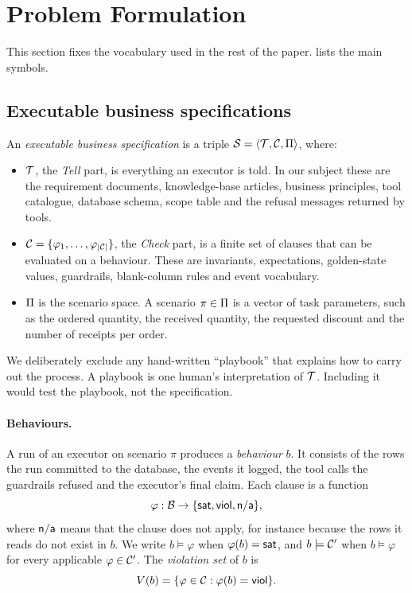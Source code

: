 \section{Problem Formulation}
\label{sec:problem}

This section fixes the vocabulary used in the rest of the paper.  lists the main symbols.

\subsection{Executable business specifications}

\begin{definition}
\label{def:spec}
An \emph{executable business specification} is a triple $\mathcal{S}=\langle\mathcal{T},\mathcal{C},\Pi\rangle$, where:
\begin{itemize}[leftmargin=*]
\item $\mathcal{T}$, the \emph{Tell} part, is everything an executor is told. In our subject these are the requirement documents, knowledge-base articles, business principles, tool catalogue, database schema, scope table and the refusal messages returned by tools.
\item $\mathcal{C}=\{\varphi_1,\dots,\varphi_{|\mathcal{C}|}\}$, the \emph{Check} part, is a finite set of clauses that can be evaluated on a behaviour. These are invariants, expectations, golden-state values, guardrails, blank-column rules and event vocabulary.
\item $\Pi$ is the scenario space. A scenario $\pi\in\Pi$ is a vector of task parameters, such as the ordered quantity, the received quantity, the requested discount and the number of receipts per order.
\end{itemize}
\end{definition}

We deliberately exclude any hand-written ``playbook'' that explains how to carry out the process. A playbook is one human's interpretation of $\mathcal{T}$. Including it would test the playbook, not the specification.

\paragraph{Behaviours.} A run of an executor on scenario $\pi$ produces a \emph{behaviour} $b$. It consists of the rows the run committed to the database, the events it logged, the tool calls the guardrails refused and the executor's final claim. Each clause is a function
\begin{equation}
\label{eq:eval}
\varphi:\mathcal{B}\to\{\textsf{sat},\textsf{viol},\textsf{n/a}\},
\end{equation}
where $\textsf{n/a}$ means that the clause does not apply, for instance because the rows it reads do not exist in $b$. We write $b\models\varphi$ when $\varphi(b)=\textsf{sat}$, and $b\models\mathcal{C}'$ when $b\models\varphi$ for every applicable $\varphi\in\mathcal{C}'$. The \emph{violation set} of $b$ is
\begin{equation}
\label{eq:violset}
V(b)=\{\varphi\in\mathcal{C}:\varphi(b)=\textsf{viol}\}.
\end{equation}

